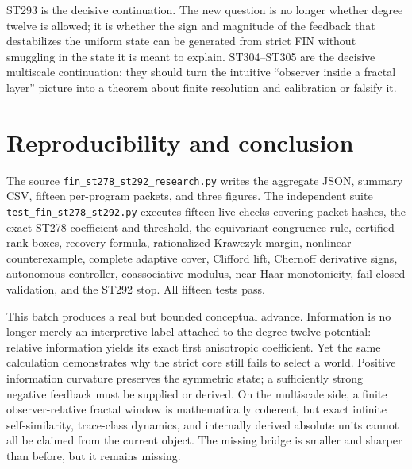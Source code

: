 \documentclass[11pt,a4paper]{article}
\begin{document}
ST293 is the decisive continuation. The new question is no longer whether degree twelve is
allowed; it is whether the sign and magnitude of the feedback that destabilizes the uniform
state can be generated from strict FIN without smuggling in the state it is meant to explain.
ST304--ST305 are the decisive multiscale continuation: they should turn the intuitive
``observer inside a fractal layer'' picture into a theorem about finite resolution and
calibration or falsify it.

\section{Reproducibility and conclusion}

The source \texttt{fin\_st278\_st292\_research.py} writes the aggregate JSON, summary CSV,
fifteen per-program packets, and three figures. The independent suite
\texttt{test\_fin\_st278\_st292.py} executes fifteen live checks covering packet hashes,
the exact ST278 coefficient and threshold, the equivariant congruence rule, certified rank
boxes, recovery formula, rationalized Krawczyk margin, nonlinear counterexample, complete
adaptive cover, Clifford lift, Chernoff derivative signs, autonomous controller,
coassociative modulus, near-Haar monotonicity, fail-closed validation, and the ST292 stop.
All fifteen tests pass.

This batch produces a real but bounded conceptual advance. Information is no longer merely
an interpretive label attached to the degree-twelve potential: relative information yields
its exact first anisotropic coefficient. Yet the same calculation demonstrates why the
strict core still fails to select a world. Positive information curvature preserves the
symmetric state; a sufficiently strong negative feedback must be supplied or derived. On
the multiscale side, a finite observer-relative fractal window is mathematically coherent,
but exact infinite self-similarity, trace-class dynamics, and internally derived absolute
units cannot all be claimed from the current object. The missing bridge is smaller and
sharper than before, but it remains missing.
\end{document}
